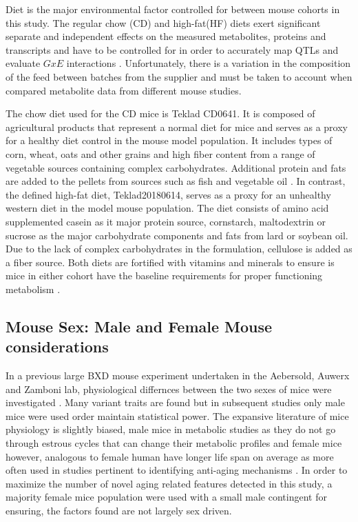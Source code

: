 \documentclass[a4paper,11pt,twoside]{book}
\begin{document}
    Diet is the major environmental factor controlled for between mouse cohorts in this study. The regular chow (CD) and high-fat(HF) diets exert significant separate and independent effects on the measured metabolites, proteins and transcripts and have to be controlled for in order to accurately map QTLs and evaluate $GxE$ interactions \citep{Warden2008}. Unfortunately, there is a variation in the composition of the feed between batches from the supplier and must be taken to account when compared metabolite data from different mouse studies.

	The chow diet used for the CD mice is Teklad CD0641. It is composed of agricultural products that represent a normal diet for mice and serves as a proxy for a healthy diet control in the mouse model population. It includes types of corn, wheat, oats and other grains and high fiber content from a range of vegetable sources containing complex carbohydrates. Additional protein and fats are added to the pellets from sources such as fish and vegetable oil \citep{Warden2008}. In contrast, the defined high-fat diet, Teklad20180614, serves as a proxy for an unhealthy western diet in the model mouse population. The diet consists of amino acid supplemented casein as it major protein source, cornstarch, maltodextrin or sucrose as the major carbohydrate components and fats from lard or soybean oil. Due to the lack of complex carbohydrates in the formulation, cellulose is added as a fiber source. Both diets are fortified with vitamins and minerals to ensure is mice in either cohort have the baseline requirements for proper functioning metabolism \citep{Warden2008}. 

	
	\subsection{Mouse Sex: Male and Female Mouse considerations}
	
	In a previous large BXD mouse experiment undertaken in the Aebersold, Auwerx and Zamboni lab, physiological differnces between the two sexes of mice were investigated \citep{Andreux2012SystemsTraits}. Many variant traits are found but in subsequent studies only male mice were used order maintain statistical power. The expansive literature of mice physiology is slightly biased, male mice in metabolic studies as they do not go through estrous cycles that can change their metabolic profiles\citep{Zucker2010MalesStudies} and female mice however, analogous to female human have longer life span on average as more often used in studies pertinent to identifying anti-aging mechanisms \citep{Yuan2011Miceaging}. In order to maximize the number of novel aging related features detected in this study, a majority female mice population were used with a small male contingent for ensuring, the factors found are not largely sex driven.
	
\end{document}
